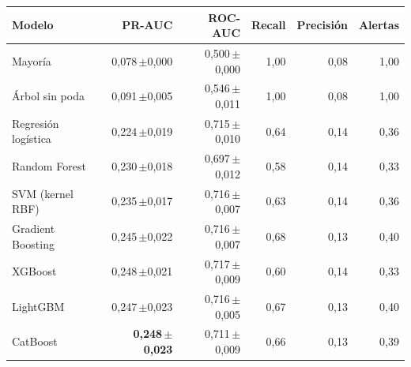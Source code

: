 \begin{tabular}{lrrrrr}
\toprule
Modelo & PR-AUC & ROC-AUC & Recall & Precisión & Alertas \\
\midrule
Mayoría & 0{,}078\,\scriptsize$\pm$0{,}000 & 0{,}500\,\scriptsize$\pm$0{,}000 & 1{,}00 & 0{,}08 & 1{,}00 \\
Árbol sin poda & 0{,}091\,\scriptsize$\pm$0{,}005 & 0{,}546\,\scriptsize$\pm$0{,}011 & 1{,}00 & 0{,}08 & 1{,}00 \\
\midrule
Regresión logística & 0{,}224\,\scriptsize$\pm$0{,}019 & 0{,}715\,\scriptsize$\pm$0{,}010 & 0{,}64 & 0{,}14 & 0{,}36 \\
Random Forest & 0{,}230\,\scriptsize$\pm$0{,}018 & 0{,}697\,\scriptsize$\pm$0{,}012 & 0{,}58 & 0{,}14 & 0{,}33 \\
SVM (kernel RBF) & 0{,}235\,\scriptsize$\pm$0{,}017 & 0{,}716\,\scriptsize$\pm$0{,}007 & 0{,}63 & 0{,}14 & 0{,}36 \\
Gradient Boosting & 0{,}245\,\scriptsize$\pm$0{,}022 & 0{,}716\,\scriptsize$\pm$0{,}007 & 0{,}68 & 0{,}13 & 0{,}40 \\
XGBoost & 0{,}248\,\scriptsize$\pm$0{,}021 & 0{,}717\,\scriptsize$\pm$0{,}009 & 0{,}60 & 0{,}14 & 0{,}33 \\
LightGBM & 0{,}247\,\scriptsize$\pm$0{,}023 & 0{,}716\,\scriptsize$\pm$0{,}005 & 0{,}67 & 0{,}13 & 0{,}40 \\
CatBoost & \textbf{0{,}248\,\scriptsize$\pm$0{,}023} & 0{,}711\,\scriptsize$\pm$0{,}009 & 0{,}66 & 0{,}13 & 0{,}39 \\
\bottomrule
\end{tabular}
